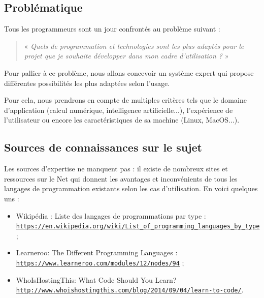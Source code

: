 \documentclass[a4paper,12pt]{article}
\begin{document}
\subsection{Problématique}

Tous les programmeurs sont un jour confrontés au problème suivant :

\begin{quotation}
\centering
« \textit{Quels de programmation et technologies sont les plus adaptés pour le projet que je souhaite développer dans mon cadre d'utilisation ?} »

\end{quotation}


    Pour pallier à ce problème, nous allons concevoir un système expert qui propose différentes possibilités les plus adaptées selon l'usage.

    Pour cela, nous prendrons en compte de multiples critères tels que le domaine d'application (calcul numérique, intelligence artificielle...), l'expérience de l'utilisateur ou encore les caractéristiques de sa machine (Linux, MacOS...).

\subsection{Sources de connaissances sur le sujet}

    Les sources d'expertise ne manquent pas : il existe de nombreux sites et ressources sur le Net qui donnent les avantages et inconvénients de tous les langages de programmation existants selon les cas d'utilisation. En voici quelques uns :
    \begin{itemize}
        \item Wikipédia : Liste des langages de programmations par type :\\ \href{https://en.wikipedia.org/wiki/List_of_programming_languages_by_type}{\texttt{https://en.wikipedia.org/wiki/List\_of\_programming\_languages\_by\_type}} ;
        \item Learneroo: The Different Programming Languages :\\ \href{https://www.learneroo.com/modules/12/nodes/94}{\texttt{https://www.learneroo.com/modules/12/nodes/94}} ;
        \item WhoIsHostingThis: What Code Should You Learn?\\ \href{http://www.whoishostingthis.com/blog/2014/09/04/learn-to-code/}{\texttt{http://www.whoishostingthis.com/blog/2014/09/04/learn-to-code/}}.
    \end{itemize}
\end{document}
